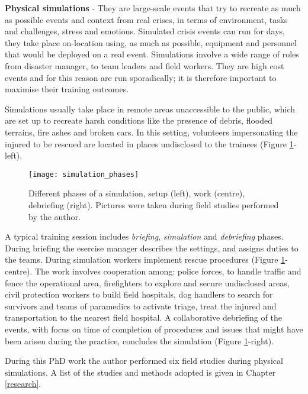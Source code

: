 \textbf{Physical simulations} - They are large-scale events that try to recreate as much as possible events and context from real crises, in terms of environment, tasks and challenges, stress and emotions. Simulated crisis events can run for days, they take place on-location using, as much as possible, equipment and personnel that would be deployed on a real event. Simulations involve a wide range of roles from disaster manager, to team leaders and field workers. They are high cost events and for this reason are run sporadically; it is therefore important to maximise their training outcomes.

Simulations usually take place in remote areas unaccessible to the public, which are set up to recreate harsh conditions like the presence of debris, flooded terrains, fire ashes and broken cars. In this setting, volunteers impersonating the injured to be rescued are located in places undisclosed to the trainees (Figure \ref{fig:simulation-phases}-left).

\begin{figure}
	[tbh] \centering 
	\texttt{[image: simulation\_phases]} \caption{Different phases of a simulation, setup (left), work (centre), debriefing (right). Pictures were taken during field studies performed by the author.} \label{fig:simulation-phases} 
\end{figure}

A typical training session includes \emph{briefing}, \emph{simulation} and \emph{debriefing} phases. During briefing the esercise manager describes the settings, and assigns duties to the teams. During simulation workers implement rescue procedures (Figure \ref{fig:simulation-phases}-centre). The work involves cooperation among: police forces, to handle traffic and fence the operational area, firefighters to explore and secure undisclosed areas, civil protection workers to build field hospitals, dog handlers to search for survivors and teams of paramedics to activate triage, treat the injured and transportation to the nearest field hospital. A collaborative debriefing of the events, with focus on time of completion of procedures and issues that might have been arisen during the practice, concludes the simulation (Figure \ref{fig:simulation-phases}-right).

During this PhD work the author performed six field studies during physical simulations. A list of the studies and methods adopted is given in Chapter \ref{research}.

